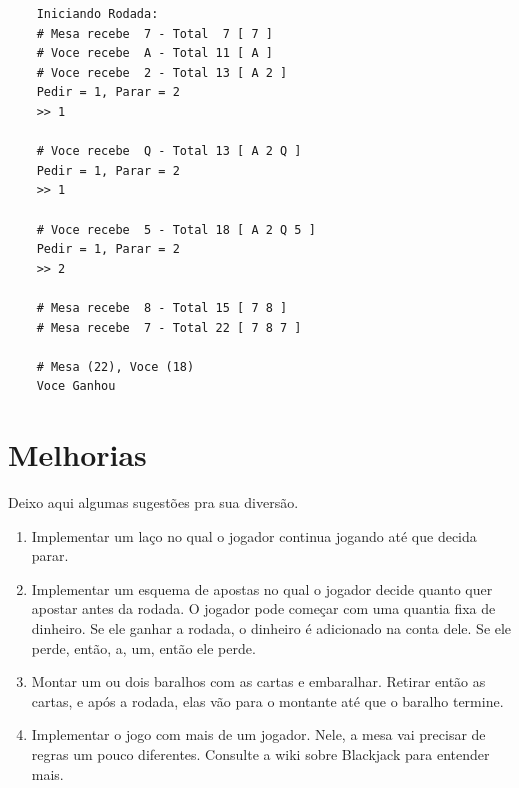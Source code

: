 \documentclass[12pt]{article}
\begin{document}
\begin{mdframed}[nobreak=true]
	\begin{verbatim}
	Iniciando Rodada:
	# Mesa recebe  7 - Total  7 [ 7 ]
	# Voce recebe  A - Total 11 [ A ]
	# Voce recebe  2 - Total 13 [ A 2 ]
	Pedir = 1, Parar = 2 
	>> 1
	
	# Voce recebe  Q - Total 13 [ A 2 Q ]
	Pedir = 1, Parar = 2 
	>> 1
	
	# Voce recebe  5 - Total 18 [ A 2 Q 5 ]
	Pedir = 1, Parar = 2 
	>> 2
	
	# Mesa recebe  8 - Total 15 [ 7 8 ]
	# Mesa recebe  7 - Total 22 [ 7 8 7 ]
	
	# Mesa (22), Voce (18)
	Voce Ganhou
	\end{verbatim}
\end{mdframed}


\section{Melhorias}

Deixo aqui algumas sugestões pra sua diversão.
\begin{enumerate}
	\item Implementar um laço no qual o jogador continua jogando até que decida parar.
	\item Implementar um esquema de apostas no qual o jogador decide quanto quer apostar antes da rodada. O jogador pode começar com uma quantia fixa de dinheiro. Se ele ganhar a rodada, o dinheiro é adicionado na conta dele. Se ele perde, então, a, um, então ele perde.
	\item Montar um ou dois baralhos com as cartas e embaralhar. Retirar então as cartas, e após a rodada, elas vão para o montante até que o baralho termine. 
	\item Implementar o jogo com mais de um jogador. Nele, a mesa vai precisar de regras um pouco diferentes. Consulte a wiki sobre Blackjack para entender mais.
\end{enumerate}
\end{document}
